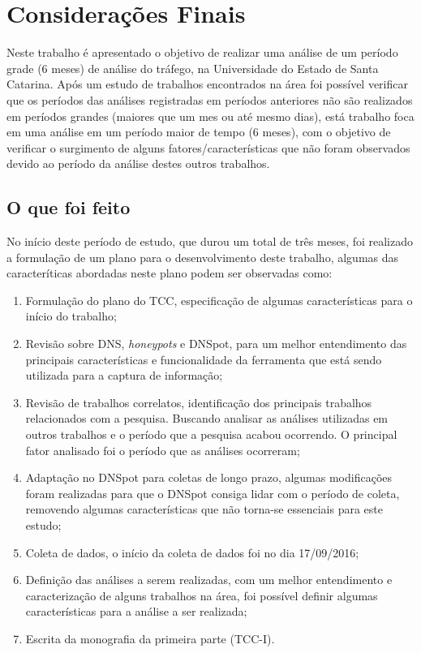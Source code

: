 \makeatletter
\def\saveenum{\xdef\@savedenum{\the\c@enumi\relax}}
\def\resetenum{\global\c@enumi\@savedenum}
\makeatother

\chapter{Considerações Finais}
\label{ch:consideracoes}

Neste trabalho é apresentado o objetivo de realizar uma análise de um período grade (6 meses) de análise do tráfego, na Universidade do Estado de Santa Catarina. Após um estudo de trabalhos encontrados na área foi possível verificar que os períodos das análises registradas em períodos anteriores não são realizados em períodos grandes (maiores que um mes ou até mesmo dias), está trabalho foca em uma análise em um período maior de tempo (6 meses), com o objetivo de verificar o surgimento de alguns fatores/características que não foram observados devido ao período da análise destes outros trabalhos.

\section{O que foi feito}\label{sec:o_que_foi_feito}

No início deste período de estudo, que durou um total de três meses, foi realizado a formulação de um plano para o desenvolvimento deste trabalho, algumas das caracteríticas abordadas neste plano podem ser observadas como:

\begin{enumerate}[label=\textnormal{(\arabic*)}]
    \item Formulação do plano do TCC, especificação de algumas características para o início do trabalho;
    \item Revisão sobre DNS, \textit{honeypots} e DNSpot, para um melhor entendimento das principais características e funcionalidade da ferramenta que está sendo utilizada para a captura de informação;
    \item Revisão de trabalhos correlatos, identificação dos principais trabalhos relacionados com a pesquisa. Buscando analisar as análises utilizadas em outros trabalhos e o período que a pesquisa acabou ocorrendo. O principal fator analisado foi o período que as análises ocorreram;
    \item Adaptação no DNSpot para coletas de longo prazo, algumas modificações foram realizadas para que o DNSpot consiga lidar com o período de coleta, removendo algumas características que não torna-se essenciais para este estudo;
    \item Coleta de dados, o início da coleta de dados foi no dia 17/09/2016; %
    \item Definição das análises a serem realizadas, com um melhor entendimento e caracterização de alguns trabalhos na área, foi possível definir algumas características para a análise a ser realizada;
    \item Escrita da monografia da primeira parte (TCC-I).
\end{enumerate}


